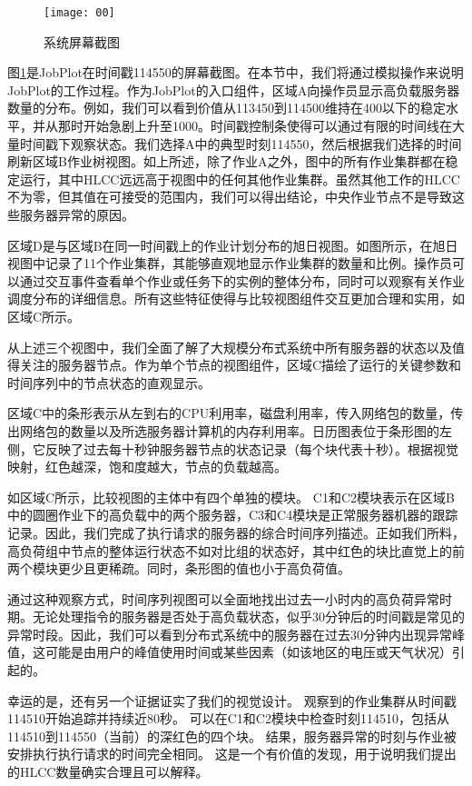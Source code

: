 \begin{figure}[h]
	\centering
	\texttt{[image: 00]}
	\caption{系统屏幕截图}
	\label{fig-7}
\end{figure}

图\ref{fig-7}是JobPlot在时间戳114550的屏幕截图。在本节中，我们将通过模拟操作来说明JobPlot的工作过程。作为JobPlot的入口组件，区域A向操作员显示高负载服务器数量的分布。例如，我们可以看到价值从113450到114500维持在400以下的稳定水平，并从那时开始急剧上升至1000。时间戳控制条使得可以通过有限的时间线在大量时间戳下观察状态。我们选择A中的典型时刻114550，然后根据我们选择的时间刷新区域B作业树视图。如上所述，除了作业A之外，图中的所有作业集群都在稳定运行，其中HLCC远远高于视图中的任何其他作业集群。虽然其他工作的HLCC不为零，但其值在可接受的范围内，我们可以得出结论，中央作业节点不是导致这些服务器异常的原因。

区域D是与区域B在同一时间戳上的作业计划分布的旭日视图。如图所示，在旭日视图中记录了11个作业集群，其能够直观地显示作业集群的数量和比例。操作员可以通过交互事件查看单个作业或任务下的实例的整体分布，同时可以观察有关作业调度分布的详细信息。所有这些特征使得与比较视图组件交互更加合理和实用，如区域C所示。

从上述三个视图中，我们全面了解了大规模分布式系统中所有服务器的状态以及值得关注的服务器节点。作为单个节点的视图组件，区域C描绘了运行的关键参数和时间序列中的节点状态的直观显示。

区域C中的条形表示从左到右的CPU利用率，磁盘利用率，传入网络包的数量，传出网络包的数量以及所选服务器计算机的内存利用率。日历图表位于条形图的左侧，它反映了过去每十秒钟服务器节点的状态记录（每个块代表十秒）。根据视觉映射，红色越深，饱和度越大，节点的负载越高。

如区域C所示，比较视图的主体中有四个单独的模块。 C1和C2模块表示在区域B中的圆圈作业下的高负载中的两个服务器，C3和C4模块是正常服务器机器的跟踪记录。因此，我们完成了执行请求的服务器的综合时间序列描述。正如我们所料，高负荷组中节点的整体运行状态不如对比组的状态好，其中红色的块比直觉上的前两个模块更少且更稀疏。同时，条形图的值也小于高负荷值。

通过这种观察方式，时间序列视图可以全面地找出过去一小时内的高负荷异常时期。无论处理指令的服务器是否处于高负载状态，似乎30分钟后的时间戳是常见的异常时段。因此，我们可以看到分布式系统中的服务器在过去30分钟内出现异常峰值，这可能是由用户的峰值使用时间或某些因素（如该地区的电压或天气状况）引起的。

幸运的是，还有另一个证据证实了我们的视觉设计。 观察到的作业集群从时间戳114510开始追踪并持续近80秒。 可以在C1和C2模块中检查时刻114510，包括从114510到114550（当前）的深红色的四个块。 结果，服务器异常的时刻与作业被安排执行执行请求的时间完全相同。 这是一个有价值的发现，用于说明我们提出的HLCC数量确实合理且可以解释。